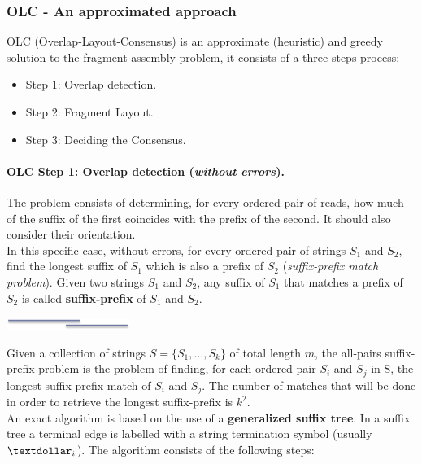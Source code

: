 \subsubsection{OLC - An approximated approach}
OLC (Overlap-Layout-Consensus) is an approximate (heuristic) and greedy solution to the fragment-assembly problem, it consists of a three steps process:
\begin{itemize}
	\item Step 1: Overlap detection.
	\item Step 2: Fragment Layout.
	\item Step 3: Deciding the Consensus.
\end{itemize}

\paragraph*{OLC Step 1: Overlap detection (\textit{without errors}).} The problem consists of determining, for every ordered pair of reads, how much of the suffix of the first coincides with the prefix of the second. It should also consider their orientation.\\
In this specific case, without errors, for every ordered pair of strings $S_1$ and $S_2$, find the longest suffix of $S_1$ which is also a prefix of $S_2$ (\textit{suffix-prefix match problem}). Given two strings $S_1$ and $S_2$, any suffix of $S_1$ that matches a prefix of $S_2$ is called \textbf{suffix-prefix} of $S_1$ and $S_2$.
\begin{center}
	\includegraphics[width=0.25\columnwidth]{img/OLC_1a}
\end{center}
Given a collection of strings $S=\{S_1, \dots, S_k\}$ of total length $m$, the all-pairs suffix-prefix problem is the problem of finding, for each ordered pair $S_i$ and $S_j$ in S, the longest suffix-prefix match of $S_i$ and $S_j$. The number of matches that will be done in order to retrieve the longest suffix-prefix is $k^2$.\\
An exact algorithm is based on the use of a \textbf{generalized suffix tree}. In a suffix tree a terminal edge is labelled with a string termination symbol (usually $\textdollar_i$). The algorithm consists of the following steps:
